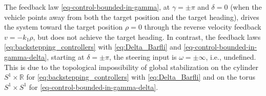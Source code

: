 \documentclass[letterpaper, 10 pt, conference]{ieeeconf}  %
\begin{document}


The feedback law \eqref{eq-control-bounded-in-gamma}, at $\gamma = \pm \pi$ and $\delta = 0$ (when the vehicle points away from both the target position and the target heading), drives the system toward the target position $\rho = 0$ through the reverse velocity feedback $v = -k_1\rho$, but does not achieve the target heading. In contrast, the feedback laws 
\eqref{eq:backstepping_controllers} with \eqref{eq:Delta_Barfli} and \eqref{eq-control-bounded-in-gamma-delta}, starting at $\delta=\pm \pi$, the steering input is $\omega = \pm \infty$, i.e., undefined. This is due to the topological impossibility of global stabilization on 
the cylinder $ S^1\times \mathbb{R}$ for \eqref{eq:backstepping_controllers} with \eqref{eq:Delta_Barfli} and on 
the torus $S^1 \times S^1$ for \eqref{eq-control-bounded-in-gamma-delta}. 

\end{document}
